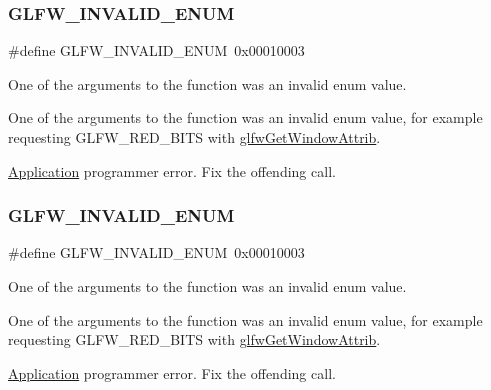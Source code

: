 \subsubsection{\texorpdfstring{G\+L\+F\+W\+\_\+\+I\+N\+V\+A\+L\+I\+D\+\_\+\+E\+N\+UM}{GLFW\_INVALID\_ENUM}\hspace{0.1cm}{\footnotesize\ttfamily [3/5]}}
{\footnotesize\ttfamily \#define G\+L\+F\+W\+\_\+\+I\+N\+V\+A\+L\+I\+D\+\_\+\+E\+N\+UM~0x00010003}



One of the arguments to the function was an invalid enum value. 

One of the arguments to the function was an invalid enum value, for example requesting G\+L\+F\+W\+\_\+\+R\+E\+D\+\_\+\+B\+I\+TS with \hyperlink{group__window_ga1bb0c7e100418e284dbb800789c63d40}{glfw\+Get\+Window\+Attrib}.

\hyperlink{classApplication}{Application} programmer error. Fix the offending call. \mbox{\label{group__errors_ga76f6bb9c4eea73db675f096b404593ce}} 
\subsubsection{\texorpdfstring{G\+L\+F\+W\+\_\+\+I\+N\+V\+A\+L\+I\+D\+\_\+\+E\+N\+UM}{GLFW\_INVALID\_ENUM}\hspace{0.1cm}{\footnotesize\ttfamily [4/5]}}
{\footnotesize\ttfamily \#define G\+L\+F\+W\+\_\+\+I\+N\+V\+A\+L\+I\+D\+\_\+\+E\+N\+UM~0x00010003}



One of the arguments to the function was an invalid enum value. 

One of the arguments to the function was an invalid enum value, for example requesting G\+L\+F\+W\+\_\+\+R\+E\+D\+\_\+\+B\+I\+TS with \hyperlink{group__window_ga1bb0c7e100418e284dbb800789c63d40}{glfw\+Get\+Window\+Attrib}.

\hyperlink{classApplication}{Application} programmer error. Fix the offending call. \mbox{\label{group__errors_ga76f6bb9c4eea73db675f096b404593ce}} 
